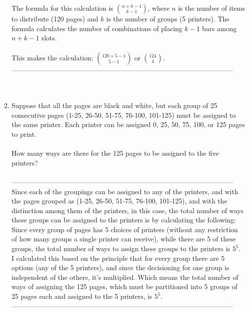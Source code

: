\documentclass{amsart}
\theoremstyle{definition}
\theoremstyle{Exercise}
\theoremstyle{remark}
\theoremstyle{rule}
\numberwithin{equation}{section}
\begin{document}
\begin{enumerate}[label=(\alph*)]
The formula for this calculation is \(\binom{n + k - 1}{k - 1}\), where \(n\) is the number of items to distribute (120 pages) and \(k\) is the number of groups (5 printers). The formula calculates the number of combinations of placing \(k - 1\) bars among \(n + k - 1\) slots.\\\\
This makes the calculation: \(\binom{120 + 5 - 1}{5 - 1}\) or \(\binom{124}{4}\).\\
--------------------------------------------------------------------------------------------------\\
        \\\\
 \item Suppose that all the pages are black and white, but each group of 25 consecutive pages (1-25, 26-50, 51-75, 76-100, 101-125) must be assigned to the same printer. Each printer can be assigned 0, 25, 50, 75, 100, or 125 pages to print.\\\\
How many ways are there for the 125 pages to be assigned to the five printers?\\\\
--------------------------------------------------------------------------------------------------\\
Since each of the groupings can be assigned to any of the printers, and with the pages grouped as (1-25, 26-50, 51-75, 76-100, 101-125), and with the distinction among them of the printers, in this case, the total number of ways these groups can be assigned to the printers is by calculating the following:\\
Since every group of pages has 5 choices of printers (without any restriction of how many groups a single printer can receive), while there are 5 of these groups, the total number of ways to assign these groups to the printers is \(5^5\).\\
I calculated this based on the principle that for every group there are 5 options (any of the 5 printers), and since the decisioning for one group is independent of the others, it's multiplied. Which means the total number of ways of assigning the 125 pages, which must be partitioned into 5 groups of 25 pages each and assigned to the 5 printers, is \(5^5\).\\
--------------------------------------------------------------------------------------------------\\
        \\\\
   \end{enumerate}
 \newpage
\end{document}
